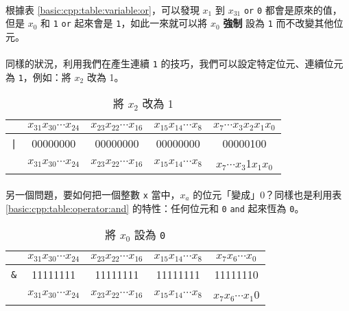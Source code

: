 \documentclass[12pt,a4paper,oneside]{report}
\begin{document}
\begin{CJK}{UTF8}{bkai}
\paragraph{}根據表 \ref{basic:cpp:table:variable:or}，可以發現 $x_{1}$ 到 $x_{31}$ \texttt{or} \lstinline!0! 都會是原來的值，但是 $x_0$ 和 \lstinline!1! \texttt{or} 起來會是 \lstinline!1!，如此一來就可以將 $x_0$ \textbf{強制} 設為 \lstinline!1! 而不改變其他位元。
\paragraph{}同樣的狀況，利用我們在產生連續 \lstinline!1! 的技巧，我們可以設定特定位元、連續位元為 \lstinline!1!，例如：將 $x_2$ 改為 1。

\begin{table}[h!]
\centering
\begin{tabular}{|c|c|c|c|c|}
\hline
 & $x_{31}x_{30}\cdots{x_{24}}$ & $x_{23}x_{22}\cdots{x_{16}}$ & $x_{15}x_{14}\cdots{x_{8}}$ & $x_{7}\cdots{x_{3}}x_{2}x_{1}x_{0}$\\
\hline
\lstinline!|! & 00000000 & 00000000 & 00000000 & 00000{\color{red}1}00\\
\hline
\hline
 & $x_{31}x_{30}\cdots{x_{24}}$ & $x_{23}x_{22}\cdots{x_{16}}$ & $x_{15}x_{14}\cdots{x_{8}}$ & $x_{7}\cdots{x_{3}}${\color{red}1}$x_{1}x_{0}$\\
\hline
\end{tabular}
\caption{將 $x_2$ 改為 1}
\label{basic:cpp:table:setbit:x2}
\end{table}

\paragraph{}另一個問題，要如何把一個整數 \lstinline!x! 當中，$x_a$ 的位元「變成」0？同樣也是利用表 \ref{basic:cpp:table:operator:and} 的特性：任何位元和 \lstinline!0! \texttt{and} 起來恆為 \lstinline!0!。

\begin{table}[h!]
\centering
\begin{tabular}{|c|c|c|c|c|}
\hline
 & $x_{31}x_{30}\cdots{x_{24}}$ & $x_{23}x_{22}\cdots{x_{16}}$ & $x_{15}x_{14}\cdots{x_{8}}$ & $x_{7}x_{6}\cdots{x_{0}}$\\
\hline
\lstinline!&! & 11111111 & 11111111 & 11111111 & 1111111{\color{red}0}\\
\hline\hline
 & $x_{31}x_{30}\cdots{x_{24}}$ & $x_{23}x_{22}\cdots{x_{16}}$ & $x_{15}x_{14}\cdots{x_{8}}$ & $x_{7}x_{6}\cdots{x_{1}}${\color{red}0}\\
\hline
\end{tabular}
\caption{將 $x_0$ 設為 \lstinline!0!}
\label{basic:cpp:table:setbit:x0:0}
\end{table}


\end{CJK}
\end{document}
